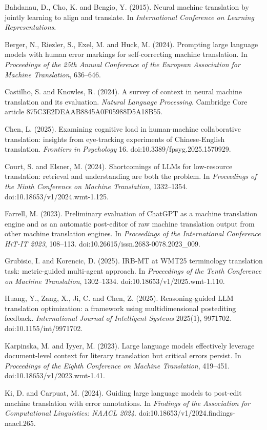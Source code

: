 \documentclass[11pt]{article}
\begin{document}
Bahdanau, D., Cho, K. and Bengio, Y. (2015). Neural machine translation by jointly learning to align and translate. In \emph{International Conference on Learning Representations}.

Berger, N., Riezler, S., Exel, M. and Huck, M. (2024). Prompting large language models with human error markings for self-correcting machine translation. In \emph{Proceedings of the 25th Annual Conference of the European Association for Machine Translation}, 636--646.

Castilho, S. and Knowles, R. (2024). A survey of context in neural machine translation and its evaluation. \emph{Natural Language Processing}. Cambridge Core article 875C3E2DEAAB8845A0F05988D5A18B55.

Chen, L. (2025). Examining cognitive load in human-machine collaborative translation: insights from eye-tracking experiments of Chinese-English translation. \emph{Frontiers in Psychology} 16. doi:10.3389/fpsyg.2025.1570929.

Court, S. and Elsner, M. (2024). Shortcomings of LLMs for low-resource translation: retrieval and understanding are both the problem. In \emph{Proceedings of the Ninth Conference on Machine Translation}, 1332--1354. doi:10.18653/v1/2024.wmt-1.125.

Farrell, M. (2023). Preliminary evaluation of ChatGPT as a machine translation engine and as an automatic post-editor of raw machine translation output from other machine translation engines. In \emph{Proceedings of the International Conference HiT-IT 2023}, 108--113. doi:10.26615/issn.2683-0078.2023\_009.

Grubisic, I. and Korencic, D. (2025). IRB-MT at WMT25 terminology translation task: metric-guided multi-agent approach. In \emph{Proceedings of the Tenth Conference on Machine Translation}, 1302--1334. doi:10.18653/v1/2025.wmt-1.110.

Huang, Y., Zang, X., Ji, C. and Chen, Z. (2025). Reasoning-guided LLM translation optimization: a framework using multidimensional postediting feedback. \emph{International Journal of Intelligent Systems} 2025(1), 9971702. doi:10.1155/int/9971702.

Karpinska, M. and Iyyer, M. (2023). Large language models effectively leverage document-level context for literary translation but critical errors persist. In \emph{Proceedings of the Eighth Conference on Machine Translation}, 419--451. doi:10.18653/v1/2023.wmt-1.41.

Ki, D. and Carpuat, M. (2024). Guiding large language models to post-edit machine translation with error annotations. In \emph{Findings of the Association for Computational Linguistics: NAACL 2024}. doi:10.18653/v1/2024.findings-naacl.265.
\end{document}
